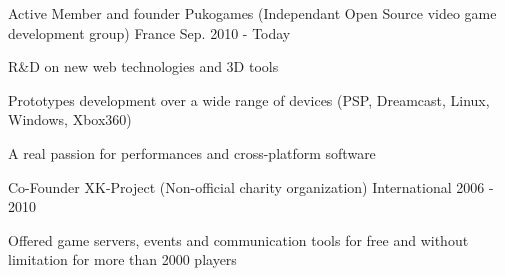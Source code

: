 

\begin{cventries}

  \cventry
    {Active Member and founder} %
    {Pukogames (Independant Open Source video game development group)} %
    {France} %
    {Sep. 2010 - Today} %
    {
      \begin{cvitems} %
        \item {R\&D on new web technologies and 3D tools}
        \item {Prototypes development over a wide range of devices (PSP, Dreamcast, Linux, Windows, Xbox360)}
        \item {A real passion for performances and cross-platform software}
      \end{cvitems}
    }

  \cventry
    {Co-Founder} %
    {XK-Project (Non-official charity organization)} %
    {International} %
    {2006 - 2010} %
    {
      \begin{cvitems} %
        \item {Offered game servers, events and communication tools for free and without limitation for more than 2000 players}
      \end{cvitems}
    }

\end{cventries}
